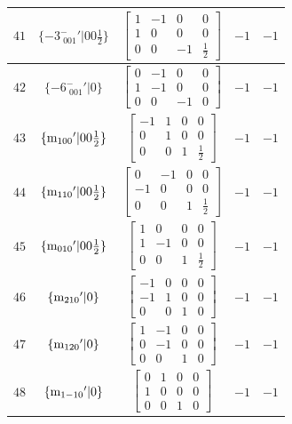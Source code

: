 \documentclass[fleqn,8pt]{jsarticle}
\begin{document}
\begin{longtable}{ccccc}
$ 41 $ & $ \{-3^{-}_{\,\,001}{}'|0 0 \frac{1}{2}\} $ & $ \begin{bmatrix} 1 & -1 & 0 & 0 \\ 1 & 0 & 0 & 0 \\ 0 & 0 & -1 & \frac{1}{2} \end{bmatrix} $ & $ -1 $ & $ -1 $ \\ \hline
$ 42 $ & $ \{-6^{-}_{\,\,001}{}'|0\} $ & $ \begin{bmatrix} 0 & -1 & 0 & 0 \\ 1 & -1 & 0 & 0 \\ 0 & 0 & -1 & 0 \end{bmatrix} $ & $ -1 $ & $ -1 $ \\ \hline
$ 43 $ & $ \{{\rm m}_{100}{}'|0 0 \frac{1}{2}\} $ & $ \begin{bmatrix} -1 & 1 & 0 & 0 \\ 0 & 1 & 0 & 0 \\ 0 & 0 & 1 & \frac{1}{2} \end{bmatrix} $ & $ -1 $ & $ -1 $ \\ \hline
$ 44 $ & $ \{{\rm m}_{110}{}'|0 0 \frac{1}{2}\} $ & $ \begin{bmatrix} 0 & -1 & 0 & 0 \\ -1 & 0 & 0 & 0 \\ 0 & 0 & 1 & \frac{1}{2} \end{bmatrix} $ & $ -1 $ & $ -1 $ \\ \hline
$ 45 $ & $ \{{\rm m}_{010}{}'|0 0 \frac{1}{2}\} $ & $ \begin{bmatrix} 1 & 0 & 0 & 0 \\ 1 & -1 & 0 & 0 \\ 0 & 0 & 1 & \frac{1}{2} \end{bmatrix} $ & $ -1 $ & $ -1 $ \\ \hline
$ 46 $ & $ \{{\rm m}_{210}{}'|0\} $ & $ \begin{bmatrix} -1 & 0 & 0 & 0 \\ -1 & 1 & 0 & 0 \\ 0 & 0 & 1 & 0 \end{bmatrix} $ & $ -1 $ & $ -1 $ \\ \hline
$ 47 $ & $ \{{\rm m}_{120}{}'|0\} $ & $ \begin{bmatrix} 1 & -1 & 0 & 0 \\ 0 & -1 & 0 & 0 \\ 0 & 0 & 1 & 0 \end{bmatrix} $ & $ -1 $ & $ -1 $ \\ \hline
$ 48 $ & $ \{{\rm m}_{1-10}{}'|0\} $ & $ \begin{bmatrix} 0 & 1 & 0 & 0 \\ 1 & 0 & 0 & 0 \\ 0 & 0 & 1 & 0 \end{bmatrix} $ & $ -1 $ & $ -1 $ \\
\end{longtable}
\end{document}
